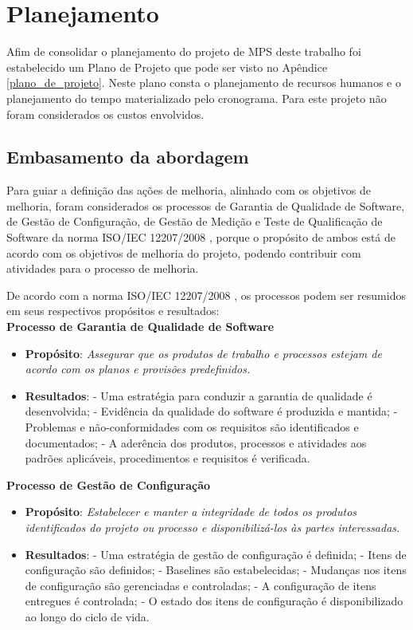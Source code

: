\chapter{Planejamento} \label{cap:planejamento}

Afim de consolidar o planejamento do projeto de MPS deste trabalho foi estabelecido um Plano de Projeto que pode ser visto no
Apêndice \ref{plano_de_projeto}. Neste plano consta o planejamento de recursos humanos e o planejamento do tempo materializado
pelo cronograma. Para este projeto não foram considerados os custos envolvidos. 


\section{Embasamento da abordagem}

Para guiar a definição das ações de melhoria, alinhado com os objetivos de melhoria,
foram considerados os processos de Garantia de Qualidade de Software, de Gestão de Configuração,
de Gestão de Medição e Teste de Qualificação de Software da norma ISO/IEC 12207/2008 \cite{12207}, porque o propósito de ambos está 
de acordo com os objetivos de melhoria do projeto, podendo contribuir com atividades para o processo de melhoria.

De acordo com a norma ISO/IEC 12207/2008 \cite{12207}, os processos podem ser resumidos em seus respectivos propósitos e resultados:\\

\noindent
\textbf{Processo de Garantia de Qualidade de Software}
\begin{itemize}
    \item \textbf{Propósito}: \emph{Assegurar que os produtos de trabalho e processos estejam de acordo com os planos e provisões predefinidos.}
    \item \textbf{Resultados}:
        \subitem - Uma estratégia para conduzir a garantia de qualidade é desenvolvida;
	\subitem - Evidência da qualidade do software é produzida e mantida;
	\subitem - Problemas e não-conformidades com os requisitos são identificados e documentados;
	\subitem - A aderência dos produtos, processos e atividades aos padrões aplicáveis, procedimentos e requisitos é verificada.
\end{itemize}


\noindent
\textbf{Processo de Gestão de Configuração}
\begin{itemize}
    \item \textbf{Propósito}: \emph{Estabelecer e manter a integridade de todos os produtos identificados do projeto ou processo
	   e disponibilizá-los às partes interessadas.}
    \item \textbf{Resultados}:
        \subitem - Uma estratégia de gestão de configuração é definida;
	\subitem - Itens de configuração são definidos;
	\subitem - Baselines são estabelecidas;
	\subitem - Mudanças nos itens de configuração são gerenciadas e controladas;
	\subitem - A configuração de itens entregues é controlada;
	\subitem - O estado dos itens de configuração é disponibilizado ao longo do ciclo de vida.
\end{itemize}


